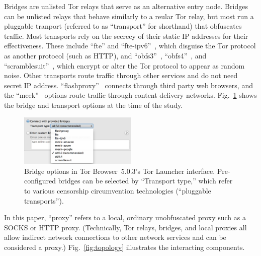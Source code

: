 \documentclass[USenglish,oneside,twocolumn]{article}
\begin{document}
Bridges are unlisted Tor relays that serve as an alternative entry node.
Bridges can be unlisted relays that behave similarly to a reular Tor relay,  
but most run a pluggable tranport (referred to as ``transport'' for shorthand) that obfuscates traffic. 
Most transports rely on the secrecy of their static IP addresses for their effectiveness.
These include ``fte'' and ``fte-ipv6''~\cite{fte},
which disguise the Tor protocol as another protocol (such as HTTP), and
``obfs3''~\cite{obfs3}, ``obfs4''~\cite{obfs4}, and ``scramblesuit''~\cite{scramblesuit},
which encrypt or alter the Tor protocol to appear as random noise.
Other transports route traffic through other services and do not need secret IP address. 
``flashproxy''~\cite{flashproxy} connects through third party web browsers,
and the ``meek''~\cite{fifield2015blocking} options route traffic
through content delivery networks. Fig.~\ref{fig:bridge-options} shows the bridge and transport options at the time of the study.

\begin{figure}
  \centering
    \includegraphics[width=0.5\textwidth]{bridge-options.png}
\caption{
Bridge options in Tor Browser~5.0.3's Tor Launcher interface.
Pre-configured bridges can be selected by ``Transport type,'' which refer to various
censorship circumvention technologies (``pluggable transports'').
}
\label{fig:bridge-options}
\end{figure}

In this paper, ``proxy'' refers to a local, ordinary unobfuscated proxy such as a SOCKS or HTTP proxy. (Technically, Tor relays, bridges, and local proxies all allow indirect network connections to other network services and can be considered a proxy.) Fig.~\ref{fig:topology} illustrates the interacting components.
\end{document}
